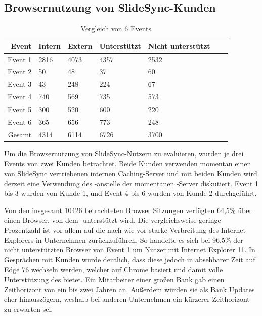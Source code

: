 \subsection{Browsernutzung von SlideSync-Kunden}\label{e:BrowserSS}

\begin{table}[!htb]\label{table-browser-slidesync}
\begin{center}

	\begin{tabular}{|r|l|l|l|l|l|l|}
		\hline
		Event	 & Intern 	& Extern 	& Unterstützt & Nicht unterstützt \\ \hline
		Event 1	 & 2816		& 4073	  	& 4357		  & 2532		\\ \hline 
		Event 2	 & 50		& 48		 	& 37			  & 60		\\ \hline 
		Event 3	 & 43		& 248	  	& 224		  & 67		\\ \hline 
		Event 4	 & 740		& 569	  	& 735		  & 573		\\ \hline 
		Event 5	 & 300		& 520	  	& 600		  & 220		\\ \hline 
		Event 6	 & 365		& 656	  	& 773		  & 248		\\ \hline 
		Gesamt	 & 4314		& 6114	  	& 6726		  & 3700		\\ \hline 

	\end{tabular}
	\caption{Vergleich von 6 Events}
\end{center}

\end{table}

Um die Browsernutzung von SlideSync-Nutzern zu evaluieren, wurden je drei Events von zwei Kunden betrachtet. Beide Kunden verwenden momentan einen von SlideSync vertriebenen internen Caching-Server und mit beiden Kunden wird derzeit eine Verwendung des \pTp-\cdns anstelle der momentanen \cdn-Server diskutiert. Event 1 bis 3 wurden von Kunde 1, und Event 4 bis 6 wurden von Kunde 2 durchgeführt. 

 Von den insgesamt 10426 betrachteten Browser Sitzungen verfügten 64,5\% über einen Browser, von dem \pTp-\cdn unterstützt wird. Die vergleichsweise geringe Prozentzahl ist vor allem auf die nach wie vor starke Verbreitung des Internet Explorers in Unternehmen zurückzuführen. So handelte es sich bei 96,5\% der nicht unterstützten Browser von Event 1 um Nutzer mit Internet Explorer 11. In Gesprächen mit Kunden wurde deutlich, dass diese jedoch in absehbarer Zeit auf Edge 76 wechseln werden, welcher auf Chrome basiert und damit volle Unterstützung des \cdns bietet.\cite{edge-chrome} Ein Mitarbeiter einer großen Bank gab einen Zeithorizont von ein bis zwei Jahren an. Außerdem würden sie als Bank Updates eher hinauszögern, weshalb bei anderen Unternehmen ein kürzerer Zeithorizont zu erwarten sei.


